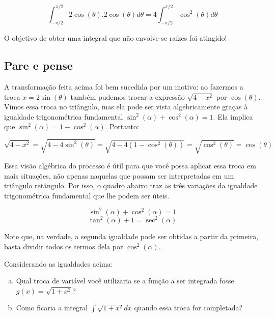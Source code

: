 \documentclass[main_estudante.tex]{subfiles}
\begin{document}
$$\int_{-\pi/2}^{\pi/2} 2\cos(\theta). 2\cos(\theta)d\theta = 4 \int_{-\pi/2}^{\pi/2} \cos^2(\theta)d\theta$$

O objetivo de obter uma integral que não envolve-se raízes foi atingido!

\subsection*{Pare e pense}

A transformação feita acima foi bem sucedida por um motivo: ao fazermos a troca $x=2\sin(\theta)$ também pudemos trocar a expressão $\sqrt{4-x^2}$ por $\cos(\theta)$. Vimos essa troca no triângulo, mas ela pode ser vista algebricamente graças à igualdade trigonométrica fundamental $\sin^2(\alpha) + \cos^2(\alpha)=1$. Ela implica que $\sin^2(\alpha)=1-\cos^2(\alpha)$. Portanto:

$$\sqrt{4-x^2} = \sqrt{4-4\sin^2(\theta)} = \sqrt{4-4(1-\cos^2(\theta))} = \sqrt{\cos^2(\theta)} = \cos(\theta)$$

Essa visão algébrica do processo é útil para que você possa aplicar essa troca em mais situações, não apenas naquelas que possam ser interpretadas em um triângulo retângulo. Por isso, o quadro abaixo traz as três variações da igualdade trigonométrica fundamental que lhe podem ser úteis.

\begin{shaded*}
$$\sin^2(\alpha) + \cos^2(\alpha)=1$$
$$\tan^2(\alpha) + 1= \sec^2(\alpha)$$
\end{shaded*}

Note que, na verdade, a segunda igualdade pode ser obtidas a partir da primeira, basta dividir todos os termos dela por $\cos^2(\alpha)$.

\begin{questao}
Considerando as igualdades acima:
\begin{enumerate}[a)]
\item Qual troca de variável você utilizaria se a função a ser integrada fosse $g(x)=\sqrt{1+x^2}$?
\item Como ficaria a integral $\int \sqrt{1+x^2} dx$ quando essa troca for completada?
\end{enumerate}
\end{questao}

\end{document}
